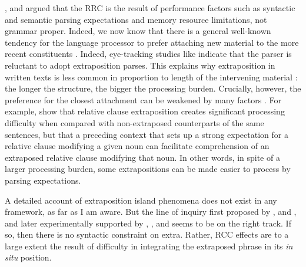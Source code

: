 \documentclass[output=paper
	        ,collection
	        ,collectionchapter
 	        ,biblatex
                ,babelshorthands
                ,newtxmath
                ,draftmode
                ,colorlinks, citecolor=brown
]{langscibook}
\begin{document}
\eal \label{nosubza}





\zl


 \citet{grosurrc},  \citet{gazdar} and \citet{stucky} argued that the RRC is the result of
  performance  factors such as  syntactic and semantic parsing expectations and  memory resource  limitations,  not grammar proper.   Indeed, we now know that  there is a general well-known  tendency for the language processor to  prefer attaching new material
 to the more recent constituents  \citep{frazcl,gibetal,trax98,fodor02b,fernandez03}. 
Indeed, eye-tracking studies like \citet{hnps}  indicate that the
parser is reluctant to adopt  extraposition  parses.
This  explains why     extraposition in written texts
is less common in proportion to length of  the  intervening material \citep{UBDKKOS98b}:
the longer the structure, the bigger the processing burden. 
 Crucially, however, the preference for the closest attachment can be weakened by
many factors \citep{fernandez03,desmet,devic,carreras}. 
For example,  \citet{levyted}  show that relative clause extraposition creates
 significant processing difficulty when compared with  non-extraposed counterparts of 
 the same sentences,   but that a preceding context that sets up a strong expectation
for a relative clause modifying a given noun can  facilitate
comprehension of an extraposed relative clause modifying that noun.
In other words, in spite of a larger processing burden,
some extrapositions can be made easier to process by parsing expectations.

A detailed account of extraposition island phenomena  does not exist in any framework, as far as I
am aware. But the line of inquiry first proposed by  \citet{grosurrc},  \citet{gazdar} and \citet{stucky},  and later experimentally supported by \citet{levyted}, \citet{SS2009a-u}, and \citet{strunk} seems to be on the right track. If so, then there is no syntactic constraint on {\sc extra}. Rather, RCC effects are to a large extent the result of difficulty in integrating the extraposed phrase in its  \emph{in situ} position.  
\end{document}
